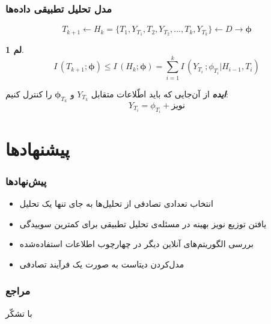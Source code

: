 \documentclass[]{beamer}
\makeatletter
\newtheorem{lem}{{\large\bf لم}}[section]
\newcommand{ \RTList}{\raggedleft\rightskip\@totalleftmargin}
\makeatother
\begin{document}
\begin{persian}
\begin{frame}
\end{frame}

\begin{frame}
\frametitle{مدل تحلیل تطبیقی داده‌ها}

$$T_{k+1} \leftarrow H_k = \{T_1, Y_{T_1}, T_2, Y_{T_2}, \dots, T_k, Y_{T_k}\}   \leftarrow D  \rightarrow \bm{\phi} $$

{
	
	\begin{lem}
		$$I\,(T_{k+1} ; \bm{\phi}) \leq I\,(H_k;\bm{\phi}) = \sum_{i = 1}^{k} I\,(Y_{T_i}\, ;\phi_{T_i}| H_{i-1}, T_i)$$
	\end{lem}
	
}
\pause
\begin{block}{
		\textit{\textbf{ایده}
}}
از آن‌جایی که باید اطّلاعات متقابل 
$Y_{T_k}$
و 
$\bm{\phi}_{T_k}$
را کنترل کنیم:
$$Y_{T_i} = \phi_{T_i} + \text{نویز}$$
\end{block}
\end{frame}




\section{پیشنهاد‌ها}

\begin{frame}
\frametitle{پیش‌نهاد‌ها}
\begin{itemize}\RTList
\item
انتخاب تعدادی تصادفی از تحلیل‌ها به جای تنها یک تحلیل

\item
یافتن توزیع نویز بهینه در مسئله‌ی تحلیل تطبیقی برای  کمترین سوییدگی


\item
بررسی الگوریتم‌های آنلاین دیگر در چهارچوب  اطلاعات استفاده‌شده

\item
مدل‌کردن دیتاست به صورت یک فرآیند تصادفی


\end{itemize}
\end{frame}






\begin{frame}
\frametitle{مراجع}
\nocite{zou, russo2016controlling, wainwright2019high}
\begin{latin}
	\begin{footnotesize}
		
		
	\end{footnotesize}
\end{latin}
\end{frame}

\begin{frame}
\Huge{با تشکّر}
\end{frame}

\end{persian}
\end{document}

